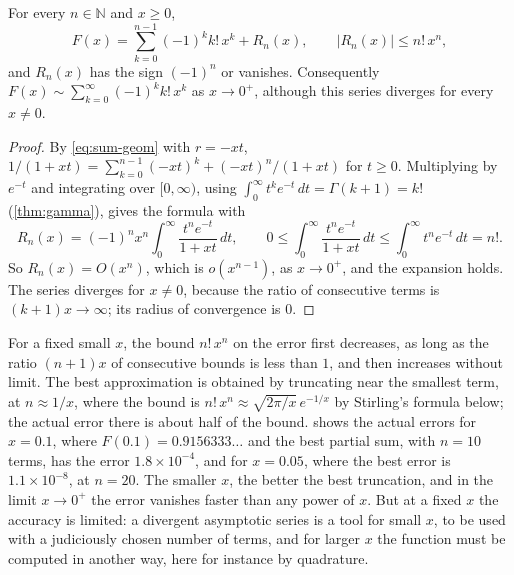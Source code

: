 \begin{proposition}
\label{prop:euler-series}
For every $n\in\mathbb N$ and $x\ge0$,
\[
F(x)=\sum_{k=0}^{n-1}(-1)^kk!\,x^k+R_n(x),\qquad|R_n(x)|\le n!\,x^n ,
\]
and $R_n(x)$ has the sign $(-1)^n$ or vanishes. Consequently $F(x)\sim\sum_{k=0}^\infty(-1)^kk!\,x^k$ as $x\to0^+$, although this series diverges for every $x\ne0$.
\end{proposition}

\begin{proof}
By \eqref{eq:sum-geom} with $r=-xt$, $1/(1+xt)=\sum_{k=0}^{n-1}(-xt)^k+(-xt)^n/(1+xt)$ for $t\ge0$. Multiplying by $e^{-t}$ and integrating over $[0,\infty)$, using $\int_0^\infty t^ke^{-t}\,dt=\Gamma(k+1)=k!$ (\cref{thm:gamma}), gives the formula with
\[
R_n(x)=(-1)^nx^n\int_0^\infty\frac{t^ne^{-t}}{1+xt}\,dt ,\qquad0\le\int_0^\infty\frac{t^ne^{-t}}{1+xt}\,dt\le\int_0^\infty t^ne^{-t}\,dt=n!.
\]
So $R_n(x)=O(x^n)$, which is $o(x^{n-1})$, as $x\to0^+$, and the expansion holds. The series diverges for $x\ne0$, because the ratio of consecutive terms is $(k+1)x\to\infty$; its radius of convergence is $0$.
\end{proof}

For a fixed small $x$, the bound $n!\,x^n$ on the error first decreases, as long as the ratio $(n+1)x$ of consecutive bounds is less than $1$, and then increases without limit. The best approximation is obtained by truncating near the smallest term, at $n\approx1/x$, where the bound is $n!\,x^n\approx\sqrt{2\pi/x}\,e^{-1/x}$ by Stirling's formula below; the actual error there is about half of the bound.  shows the actual errors for $x=0.1$, where $F(0.1)=0.9156333\ldots$ and the best partial sum, with $n=10$ terms, has the error $1.8\times10^{-4}$, and for $x=0.05$, where the best error is $1.1\times10^{-8}$, at $n=20$. The smaller $x$, the better the best truncation, and in the limit $x\to0^+$ the error vanishes faster than any power of $x$. But at a fixed $x$ the accuracy is limited: a divergent asymptotic series is a tool for small $x$, to be used with a judiciously chosen number of terms, and for larger $x$ the function must be computed in another way, here for instance by quadrature.

